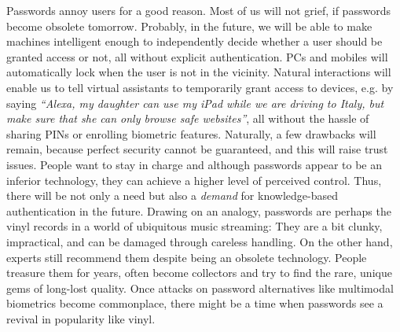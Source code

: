 Passwords annoy users for a good reason. Most of us will not grief, if passwords become obsolete tomorrow. Probably, in the future, we will be able to make machines intelligent enough to independently decide whether a user should be granted access or not, all without explicit authentication. PCs and mobiles will automatically lock when the user is not in the vicinity. Natural interactions will enable us to tell virtual assistants to temporarily grant access to devices, e.g. by saying \textit{``Alexa, my daughter can use my iPad while we are driving to Italy, but make sure that she can only browse safe websites''}, all without the hassle of sharing PINs or enrolling biometric features. Naturally, a few drawbacks will remain, because perfect security cannot be guaranteed, and this will raise trust issues. People want to stay in charge and although passwords appear to be an inferior technology, they can achieve a higher level of perceived control. Thus, there will be not only a need but also a \textit{demand} for knowledge-based authentication in the future. Drawing on an analogy, passwords are perhaps the vinyl records in a world of ubiquitous music streaming: They are a bit clunky, impractical, and can be damaged through careless handling. On the other hand, experts still recommend them despite being an obsolete technology. People treasure them for years, often become collectors and try to find the rare, unique gems of long-lost quality. Once attacks on password alternatives like multimodal biometrics become commonplace, there might be a time when passwords see a revival in popularity like vinyl. 





